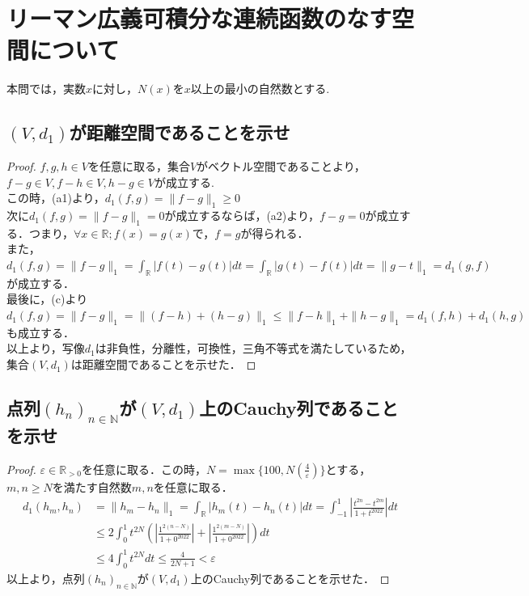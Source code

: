 \documentclass{jreport}
\newcommand{\R}{\mathbb{R}}
\newcommand{\Rp}{\mathbb{R}_{>0}}
\begin{document}
\section{リーマン広義可積分な連続函数のなす空間について}
本問では，実数$x$に対し，$N(x)$を$x$以上の最小の自然数とする.
\subsection{$(V,d_1)$が距離空間であることを示せ}
\begin{proof}
$f,g,h \in V$を任意に取る，集合$V$がベクトル空間であることより，$f-g\in V,f-h \in V,h-g \in V$が成立する.\\
この時，(a1)より，$d_1(f,g) = \| f-g \|_1 \ge 0$\\
次に$d_1(f,g) = \| f-g \|_1 =0$が成立するならば，(a2)より，$f-g=0$が成立する．つまり，$\forall x \in \R; f(x) =g(x)$で，$f=g$が得られる．\\
また，$d_1(f,g) = \|f-g\|_1= \int_{\R}|f(t)-g(t)|dt= \int_{\R}|g(t)-f(t)|dt=\|g-t\|_1=d_1(g,f)$が成立する．\\
最後に，(c)より$d_1(f,g) = \| f-g\|_1= \|(f-h)+(h-g)\|_1 \le \|f-h\|_1 +\|h-g\|_1 = d_1(f,h) + d_1(h,g)$も成立する．\\
以上より，写像$d_1$は非負性，分離性，可換性，三角不等式を満たしているため，集合$(V,d_1)$は距離空間であることを示せた．
\end{proof}
\newpage
\subsection{点列$(h_n)_{n \in \mathbb{N}}$が$(V,d_1)$上のCauchy列であることを示せ}
\begin{proof}
	$\varepsilon \in \Rp$を任意に取る．この時，$N=\max\{100,N(\frac{4}{\varepsilon}) \}$とする，$m,n \ge N$を満たす自然数$m,n$を任意に取る．\\
	$$
	\begin{aligned}
		d_1(h_m,h_n) &=\|h_m - h_n\|_1 = \int_{\R} |h_m(t) - h_n(t) |dt = \int_{-1}^{1} \left| \frac{t^{2n} - t^{2m}}{1+t^{2022}} \right| dt\\
			     &\le 2 \int_0^1 t^{2N}  \left( \left| \frac{1^{2(n-N)}}{1+0^{2022}} \right| + \left| \frac{1^{2(m-N)}}{1+0^{2022}} \right| \right)dt\\
			     &\le 4 \int_0^1 t^{2N} dt \le \frac{4}{2N+1} <\varepsilon
	\end{aligned}
	$$
	以上より，点列$(h_n)_{n \in \mathbb{N}}$が$(V,d_1)$上のCauchy列であることを示せた．
\end{proof}
\newpage
\end{document}
